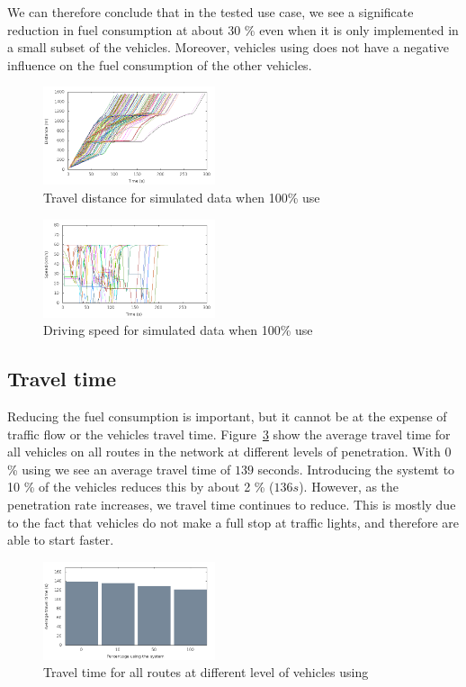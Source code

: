 We can therefore conclude that in the tested use case, we see a significate reduction in fuel consumption at about 30 \% even when it is only implemented in a small subset of the vehicles.
Moreover, vehicles using \tech does not have a negative influence on the fuel consumption of the other vehicles.
\begin{figure}[htb]
\includegraphics[width=0.45\textwidth]{../images/tp0c0_8/distanceControlled100.png}
\caption{Travel distance for simulated data when 100\% use \tech}
\label{fig:TestResults:distance100}
\end{figure}

\begin{figure}[htb]
\includegraphics[width=0.45\textwidth]{../images/tp0c0_8/speedControlled100.png}
\caption{Driving speed for simulated data when 100\% use \tech}
\label{fig:TestResults:speed100}
\end{figure}

\subsection{Travel time}
Reducing the fuel consumption is important, but it cannot be at the expense of traffic flow or the vehicles travel time.
Figure~\ref{fig:TestResults:combinedTime} show the average travel time for all vehicles on all routes in the network at different levels of penetration.
With 0 \% using \tech we see an average travel time of $139$ seconds. 
Introducing the systemt to 10 \% of the vehicles reduces this by about 2 \% ($136s$). 
However, as the penetration rate increases, we travel time continues to reduce. 
This is mostly due to the fact that vehicles do not make a full stop at traffic lights, and therefore are able to start faster.

\begin{figure}[htb]
\includegraphics[width=0.45\textwidth]{../images/tp0c0_8/combinedTime.png}
\caption{Travel time for all routes at different level of vehicles using \tech}
\label{fig:TestResults:combinedTime}
\end{figure}

